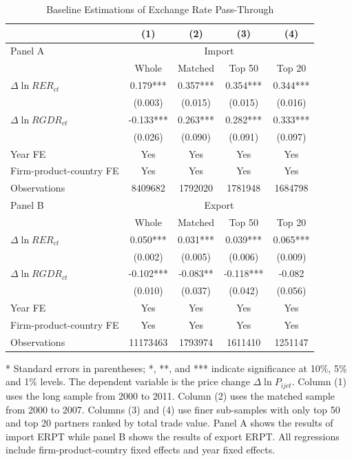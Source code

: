 \documentclass[12pt]{article}
\begin{document}
\begin{table}[htbp]
	\centering
	\caption{Baseline Estimations of Exchange Rate Pass-Through}
	\begin{threeparttable}
	\begin{tabular}{lcccc}
		\toprule
		& (1)   & (2)   & (3)   & (4) \\
		\midrule
		Panel A & \multicolumn{4}{c}{Import} \\
		& Whole & Matched & Top 50 & Top 20 \\
		\midrule
		$\Delta \ln RER_{ct}$ & 0.179*** & 0.357*** & 0.354*** & 0.344*** \\
		& (0.003) & (0.015) & (0.015) & (0.016) \\
		$\Delta \ln RGDR_{ct}$ & -0.133*** & 0.263*** & 0.282*** & 0.333*** \\
		& (0.026) & (0.090) & (0.091) & (0.097) \\
		Year FE  & Yes   & Yes   & Yes   & Yes \\
		Firm-product-country FE & Yes   & Yes   & Yes   & Yes \\
		Observations & 8409682 & 1792020 & 1781948 & 1684798 \\
		\midrule
		Panel B & \multicolumn{4}{c}{Export} \\
		& Whole & Matched & Top 50 & Top 20 \\
		\midrule
		$\Delta \ln RER_{ct}$ & 0.050*** & 0.031*** & 0.039*** & 0.065*** \\
		& (0.002) & (0.005) & (0.006) & (0.009) \\
		$\Delta \ln RGDR_{ct}$ & -0.102*** & -0.083** & -0.118*** & -0.082 \\
		& (0.010) & (0.037) & (0.042) & (0.056) \\
		Year FE  & Yes   & Yes   & Yes   & Yes \\
		Firm-product-country FE & Yes   & Yes   & Yes   & Yes \\
		Observations & 11173463 & 1793974 & 1611410 & 1251147 \\
		\bottomrule
	\end{tabular}
	\begin{tablenotes}
		\footnotesize
		\item[*] Standard errors in parentheses; *, **, and *** indicate significance at 10\%, 5\% and 1\% levels. The dependent variable is the price change $\Delta \ln P_{ijct}$. Column (1) uses the long sample from 2000 to 2011. Column (2) uses the matched sample from 2000 to 2007. Columns (3) and (4) use finer sub-samples with only top 50 and top 20 partners ranked by total trade value. Panel A shows the results of import ERPT while panel B shows the results of export ERPT. All regressions include firm-product-country fixed effects and year fixed effects. 
	\end{tablenotes}
	\end{threeparttable}
	\label{tab.baseline}
\end{table}
\end{document}
